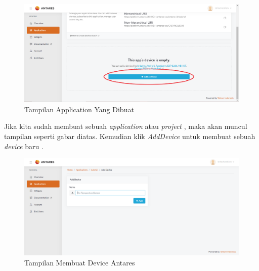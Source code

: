 \begin{enumerate}
     \begin{figure}[H]
    \centering
    \includegraphics[width=1\textwidth]{figures/project4.png}
    \caption{Tampilan Application Yang Dibuat}
    \label{print}
    \end{figure}
    
    \par Jika kita sudah membuat sebuah \textit{application} atau \textit{project} , maka akan muncul tampilan seperti gabar diatas. Kemudian klik \textit{AddDevice} untuk membuat sebuah \textit{device} baru .
    
     \begin{figure}[H]
    \centering
    \includegraphics[width=1\textwidth]{figures/project5.png}
    \caption{Tampilan Membuat Device Antares}
    \label{print}
    \end{figure}
    

\end{enumerate}
